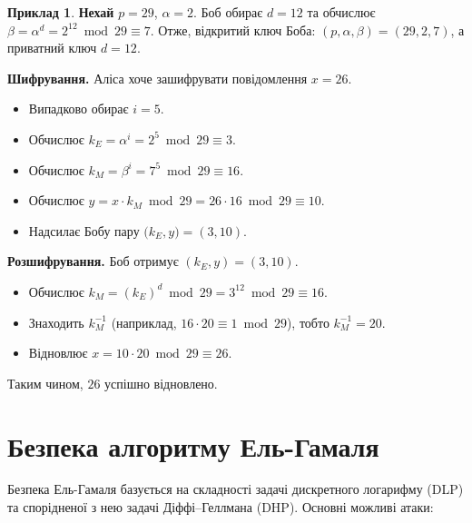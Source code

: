 \documentclass[12pt]{report}
\theoremstyle{definition}
\newtheorem{example}{Приклад}[chapter]
\theoremstyle{plain}
\begin{document}
\begin{example}
\textbf{Нехай} \(p = 29\), \(\alpha = 2\). Боб обирає \(d = 12\) та обчислює 
\(\beta = \alpha^d = 2^{12} \bmod 29 \equiv 7\). 
Отже, відкритий ключ Боба: \((p, \alpha, \beta) = (29, 2, 7)\), а приватний ключ \(d = 12\).

\textbf{Шифрування.} Аліса хоче зашифрувати повідомлення \(x = 26\).
\begin{itemize}
    \item Випадково обирає \(i = 5\).
    \item Обчислює \(k_E = \alpha^i = 2^5 \bmod 29 \equiv 3\).
    \item Обчислює \(k_M = \beta^i = 7^5 \bmod 29 \equiv 16\).
    \item Обчислює \(y = x \cdot k_M \bmod 29 = 26 \cdot 16 \bmod 29 \equiv 10\).
    \item Надсилає Бобу пару \(\bigl(k_E, y\bigr) = (3, 10)\).
\end{itemize}

\textbf{Розшифрування.} Боб отримує \((k_E, y) = (3, 10)\).
\begin{itemize}
    \item Обчислює \(k_M = (k_E)^d \bmod 29 = 3^{12} \bmod 29 \equiv 16\).
    \item Знаходить \(k_M^{-1}\) (наприклад, \(16 \cdot 20 \equiv 1 \bmod 29\)), тобто 
          \(k_M^{-1} = 20\).
    \item Відновлює \(x = 10 \cdot 20 \bmod 29 \equiv 26\).
\end{itemize}

Таким чином, \(26\) успішно відновлено.
\end{example}

\section{Безпека алгоритму Ель-Гамаля}

Безпека Ель-Гамаля базується на складності задачі дискретного логарифму (DLP) 
та спорідненої з нею задачі Діффі–Геллмана (DHP). Основні можливі атаки:
\end{document}
